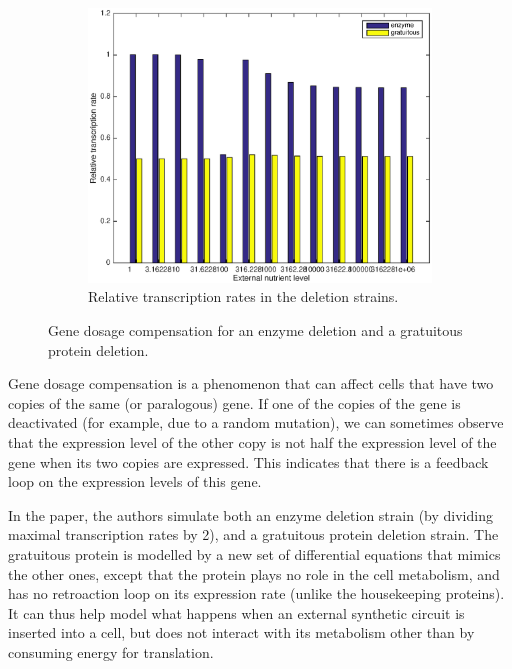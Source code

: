 \documentclass[a4paper]{article}
\begin{document}
\begin{figure}[h]
\centering
\begin{subfigure}{0.49\textwidth}
\includegraphics[width=\textwidth]{reltransdel.eps}
\caption{Relative transcription rates in the deletion strains.}
\label{reltransdel}
\end{subfigure}

\caption{Gene dosage compensation for an enzyme deletion and a gratuitous protein deletion.}
\label{resp}
\end{figure}

Gene dosage compensation is a phenomenon that can affect cells that have two copies of the same (or paralogous) gene.
If one of the copies of the gene is deactivated (for example, due to a random mutation), we can sometimes observe that the expression level of the other copy is not half the expression level of the gene when its two copies are expressed.
This indicates that there is a feedback loop on the expression levels of this gene.

In the paper, the authors simulate both an enzyme deletion strain (by dividing maximal transcription rates by 2), and a gratuitous protein deletion strain.
The gratuitous protein is modelled by a new set of differential equations that mimics the other ones, except that the protein plays no role in the cell metabolism, and has no retroaction loop on its expression rate (unlike the housekeeping proteins).
It can thus help model what happens when an external synthetic circuit is inserted into a cell, but does not interact with its metabolism other than by consuming energy for translation.
\end{document}
